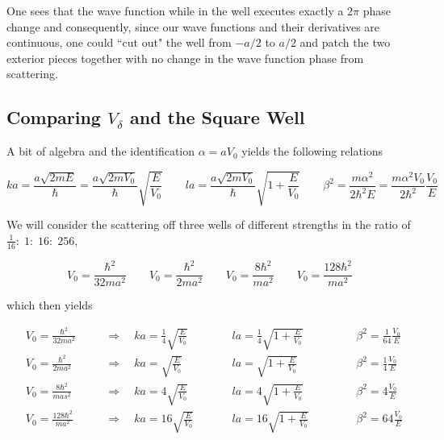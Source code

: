 One sees that the wave function while in the well executes exactly
a   $2\pi$  phase change and consequently, since our wave functions and their
derivatives are continuous, one could “cut out" the well from  $-a/2$  to  $a/
2$ and patch the two exterior pieces together with no change in the wave function
phase from scattering.



\subsection{Comparing  $V_\delta$ and the Square Well} 

A bit of algebra and the identification $\alpha = aV_0$ yields the following
relations

\[
ka = \frac{a\sqrt{2mE}}{\hbar}
= \frac{a\sqrt{2mV_0}}{\hbar}\sqrt{\frac{E}{V_0}} \qquad la
= \frac{a\sqrt{2mV_0}}{\hbar} \sqrt{1+\frac{E}{V_0}} \qquad \beta^2
= \frac{m\alpha^2}{2\hbar^2 E} = \frac{m\alpha^2V_0}{2\hbar^2}\frac{V_0}{E}
\] \vspace{3px}

We will consider the scattering off three wells of different strengths in the
ratio of $\frac{1}{16}: \; 1: \; 16: \; 256$, 

\[
V_0 = \frac{\hbar^2}{32ma^2} \qquad V_0 = \frac{\hbar^2}{2ma^2} \qquad V_0
= \frac{8\hbar^2}{ma^2} \qquad V_0 = \frac{128\hbar^2}{ma^2}
\] \vspace{3px}

which then yields

\begin{align} \label{}
  &V_0 = \frac{\hbar^2}{32ma^2} &&\quad \Rightarrow \quad ka = \frac{1}{4}\sqrt{\frac{E}{V_0}}
  &&&\quad la = \frac{1}{4}\sqrt{1 + \frac{E}{V_0}} &&&&\quad \beta^2
  = \frac{1}{64}\frac{V_0}{E} \\ 
  &V_0 = \frac{\hbar^2}{2ma^2} &&\quad \Rightarrow \quad ka
  = \sqrt{\frac{E}{V_0}} &&&\quad la = \sqrt{1 + \frac{E}{V_0}} &&&&\quad
  \beta^2 = \frac{1}{4}\frac{V_0}{E} \\ 
  &V_0 = \frac{8\hbar^2}{mas^2} &&\quad \Rightarrow \quad ka
  = 4\sqrt{\frac{E}{V_0}} &&&\quad la = 4\sqrt{1 + \frac{E}{V_0}} &&&&\quad
  \beta^2 = 4\frac{V_0}{E} \\
                          &V_0 = \frac{128\hbar^2}{ma^2} &&\quad \Rightarrow
  \quad ka = 16\sqrt{\frac{E}{V_0}} &&&\quad la = 16\sqrt{1+ \frac{E}{V_0}}
                                    &&&&\quad \beta^2 = 64\frac{V_0}{E}
\end{align}\vspace{3px}


